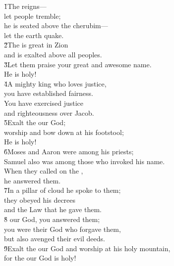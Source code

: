 \begin{poetry}
\poeml \v{1}The  reigns--- \\
\poemll    let people tremble; \\
\poeml he is seated above the cherubim--- \\
\poemll    let the earth quake. \\
\poeml \v{2}The  is great in Zion \\
\poemll    and is exalted above all peoples. \\
\poeml \v{3}Let them praise your great and awesome name. \\
\poemll    He is holy! \\
\poeml \v{4}A mighty king who loves justice, \\
\poemll    you have established fairness. \\
\poeml You have exercised justice \\
\poemll    and righteousness over Jacob. \\
\poeml \v{5}Exalt the  our God; \\
\poemll    worship and bow down at his footstool; \\
\poemlll       He is holy! \\
\poeml \v{6}Moses and Aaron were among his priests; \\
\poemll    Samuel also was among those who invoked his name. \\
\poeml When they called on the , \\
\poemll    he answered them. \\
\poeml \v{7}In a pillar of cloud he spoke to them; \\
\poemll    they obeyed his decrees \\
\poemlll       and the Law that he gave them. \\
\poeml \v{8} our God, you answered them; \\
\poemll    you were their God who forgave them, \\
\poemlll       but also avenged their evil deeds. \\
\poeml \v{9}Exalt the  our God and worship at his holy mountain, \\
\poemll    for the  our God is holy!
\end{poetry}

